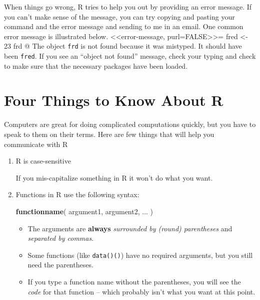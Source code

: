 \documentclass[]{book}
\newenvironment{Shaded}{\begin{snugshade}}{\end{snugshade}}
\newcommand{\KeywordTok}[1]{\textcolor[rgb]{0.13,0.29,0.53}{\textbf{#1}}}
\newcommand{\NormalTok}[1]{#1}
\begin{document}
When things go wrong, R tries to help you out by providing an error message. If you can't make sense of the message, you can try copying and pasting your command and the error message and sending to me in an email. One common error message is illustrated below.
\textless\textless error-message, purl=FALSE\textgreater\textgreater=
fred \textless- 23
frd
@
The object \texttt{frd} is not found because it was mistyped. It should have been \texttt{fred}. If you see an ``object not found'' message, check your typing and check to make sure that the necessary packages have been loaded.

\hypertarget{four-things-to-know-about-r}{%
\section{Four Things to Know About R}\label{four-things-to-know-about-r}}

Computers are great for doing complicated computations quickly, but you have to speak to them on their terms. Here are few things that will help you communicate with R

\begin{enumerate}
\def\labelenumi{(\arabic{enumi})}
\item
  R is case-sensitive

  If you mis-capitalize something in R it won't do what you want.
\item
  Functions in R use the following syntax:

\begin{Shaded}
\begin{Highlighting}[]
  \KeywordTok{functionname}\NormalTok{( argument1, argument2, ... )}
\end{Highlighting}
\end{Shaded}

  \begin{itemize}
  \item
    The arguments are \textbf{always} \emph{surrounded by (round) parentheses} and \emph{separated by commas}.
  \item
    Some functions (like \texttt{data()()}) have no required arguments, but you still need the parentheses.
  \item
    If you type a function name without the parentheses, you will see the \emph{code} for that function -- which probably isn't what you want at this point.
  \end{itemize}
\end{enumerate}
\end{document}
